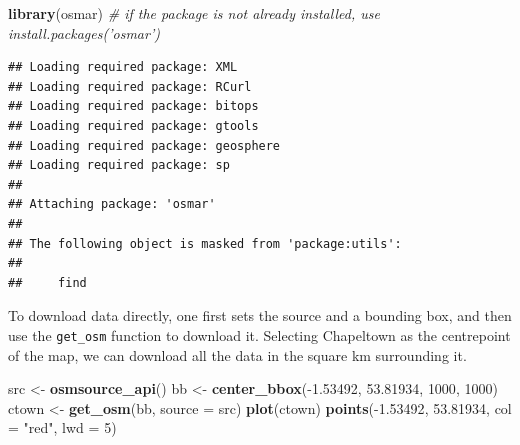\documentclass[]{article}
\newenvironment{Shaded}{}{}
\newcommand{\KeywordTok}[1]{\textcolor[rgb]{0.00,0.44,0.13}{\textbf{{#1}}}}
\newcommand{\DataTypeTok}[1]{\textcolor[rgb]{0.56,0.13,0.00}{{#1}}}
\newcommand{\DecValTok}[1]{\textcolor[rgb]{0.25,0.63,0.44}{{#1}}}
\newcommand{\FloatTok}[1]{\textcolor[rgb]{0.25,0.63,0.44}{{#1}}}
\newcommand{\StringTok}[1]{\textcolor[rgb]{0.25,0.44,0.63}{{#1}}}
\newcommand{\CommentTok}[1]{\textcolor[rgb]{0.38,0.63,0.69}{\textit{{#1}}}}
\newcommand{\NormalTok}[1]{{#1}}
\begin{document}
\begin{Shaded}
\begin{Highlighting}[]
\KeywordTok{library}\NormalTok{(osmar)  }\CommentTok{# if the package is not already installed, use install.packages('osmar')}
\end{Highlighting}
\end{Shaded}

\begin{verbatim}
## Loading required package: XML
## Loading required package: RCurl
## Loading required package: bitops
## Loading required package: gtools
## Loading required package: geosphere
## Loading required package: sp
## 
## Attaching package: 'osmar'
## 
## The following object is masked from 'package:utils':
## 
##     find
\end{verbatim}

To download data directly, one first sets the source and a bounding box,
and then use the \texttt{get\_osm} function to download it. Selecting
Chapeltown as the centrepoint of the map, we can download all the data
in the square km surrounding it.

\begin{Shaded}
\begin{Highlighting}[]
\NormalTok{src <-}\StringTok{ }\KeywordTok{osmsource_api}\NormalTok{()}
\NormalTok{bb <-}\StringTok{ }\KeywordTok{center_bbox}\NormalTok{(-}\FloatTok{1.53492}\NormalTok{, }\FloatTok{53.81934}\NormalTok{, }\DecValTok{1000}\NormalTok{, }\DecValTok{1000}\NormalTok{)}
\NormalTok{ctown <-}\StringTok{ }\KeywordTok{get_osm}\NormalTok{(bb, }\DataTypeTok{source =} \NormalTok{src)}
\KeywordTok{plot}\NormalTok{(ctown)}
\KeywordTok{points}\NormalTok{(-}\FloatTok{1.53492}\NormalTok{, }\FloatTok{53.81934}\NormalTok{, }\DataTypeTok{col =} \StringTok{"red"}\NormalTok{, }\DataTypeTok{lwd =} \DecValTok{5}\NormalTok{)}
\end{Highlighting}
\end{Shaded}
\end{document}
